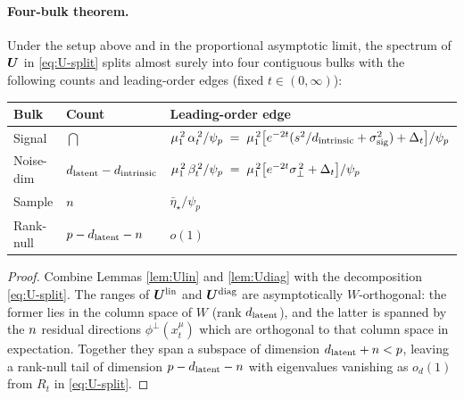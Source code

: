 \paragraph{Four-bulk theorem.}
\begin{theorem}
\label{thm:fourbulk}
Under the setup above and in the proportional asymptotic limit, the
spectrum of $\bm{U}$ in \eqref{eq:U-split} splits almost surely into
four contiguous bulks with the following counts and leading-order
edges (fixed $t \in (0,\infty)$):
\begin{center}
\begin{tabular}{@{}lll@{}}
\toprule
Bulk & Count & Leading-order edge \\
\midrule
Signal      & $\dint$                  & $\mu_1^{\,2}\,\alpha_t^{\,2}/\psi_p
                                          \;=\; \mu_1^{\,2}\bigl[e^{-2t}(s^2/d_{\mathrm{intrinsic}}+\sigma_{\mathrm{sig}}^2)+\Delta_t\bigr]/\psi_p$ \\
Noise-dim   & $d_{\mathrm{latent}}-d_{\mathrm{intrinsic}}$            & $\mu_1^{\,2}\,\beta_t^{\,2}/\psi_p
                                          \;=\; \mu_1^{\,2}\bigl[e^{-2t}\sigma_{\perp}^{\,2}+\Delta_t\bigr]/\psi_p$ \\
Sample      & $n$                 & $\bar\eta_\star/\psi_p$ \\
Rank-null   & $p-d_{\mathrm{latent}}-n$   & $o(1)$ \\
\bottomrule
\end{tabular}
\end{center}
\end{theorem}
\begin{proof}
Combine Lemmas \ref{lem:Ulin} and \ref{lem:Udiag} with the
decomposition \eqref{eq:U-split}. The ranges of $\bm{U}^{\mathrm{lin}}$
and $\bm{U}^{\mathrm{diag}}$ are asymptotically $W$-orthogonal: the
former lies in the column space of $W$ (rank $d_{\mathrm{latent}}$), and the latter
is spanned by the $n$ residual directions $\phi^\perp(x_t^\mu)$
which are orthogonal to that column space in expectation. Together
they span a subspace of dimension $d_{\mathrm{latent}} + n < p$, leaving
a rank-null tail of dimension $p - d_{\mathrm{latent}} - n$ with
eigenvalues vanishing as $o_d(1)$ from $R_t$ in \eqref{eq:U-split}.
\end{proof}

